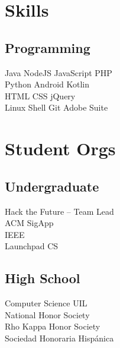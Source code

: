 \documentclass[letterpaper]{deedy-resume} %
\begin{document}
\begin{minipage}[t]{0.33\textwidth}
\sectionspace %


\section{Skills}

\subsection{Programming}
Java \textbullet{} NodeJS \textbullet{} JavaScript \textbullet{} PHP \\
Python \textbullet{} Android \textbullet{} Kotlin \\
HTML \textbullet{} CSS \textbullet{} jQuery \\
Linux \textbullet{} Shell \textbullet{} Git \textbullet{} Adobe Suite \\

\sectionspace %


\section{Student Orgs}

\subsection{Undergraduate}

Hack the Future -- Team Lead \\
ACM SigApp \\
IEEE \\
Launchpad CS \\

\sectionspace %


\subsection{High School}

Computer Science UIL  \\
National Honor Society \\
Rho Kappa Honor Society \\
Sociedad Honoraria Hispánica \\

\sectionspace %



\end{minipage} %
\end{document}
